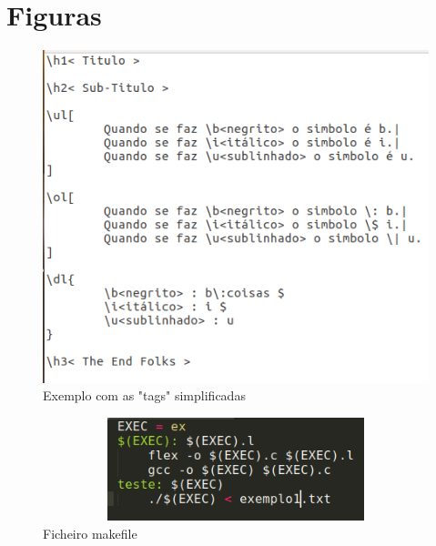 \documentclass{report}
\begin{document}
\chapter{Figuras}
\begin{figure}[h]
\centering
\includegraphics[scale= 0.5]{exemplo1.png}
\caption{Exemplo com as "tags" simplificadas}
\label{Exemplo 1}
\end{figure}

\begin{figure}[h]
\centering
\includegraphics[width=15cm,height= 3cm]{makefile.png}
\caption{Ficheiro makefile}
\label{makefile}
\end{figure}
\end{document}
